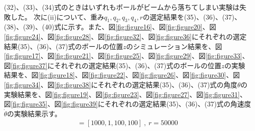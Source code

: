 \documentclass[a4paper,10.5pt]{ltjsarticle}
\begin{document}
(32)、(33)、(34)式のときはいずれもボールがビームから落ちてしまい実験は失敗した。
次に(ii)について、重み$q_1,q_2,q_3,q_4,r$の選定結果を(35)、(36)、(37)、(38)、(39)、(40)式に示す。また、図\ref{fig:figure16}、図\ref{fig:figure20}、図\ref{fig:figure24}、図\ref{fig:figure28}、図\ref{fig:figure32}、図\ref{fig:figure36}にそれぞれの選定結果(35)、(36)、(37)式のボールの位置$z$のシミュレーション結果を、図\ref{fig:figure17}、図\ref{fig:figure21}、図\ref{fig:figure25}、図\ref{fig:figure29}、図\ref{fig:figure33}、図\ref{fig:figure37}にそれぞれの選定結果(35)、(36)、(37)式のボールの位置$z$の実験結果を、図\ref{fig:figure18}、図\ref{fig:figure22}、図\ref{fig:figure26}、図\ref{fig:figure30}、図\ref{fig:figure34}、図\ref{fig:figure38}にそれぞれの選定結果(35)、(36)、(37)式の角度$\theta$の実験結果を、図\ref{fig:figure19}、図\ref{fig:figure23}、図\ref{fig:figure27}、図\ref{fig:figure31}、図\ref{fig:figure35}、図\ref{fig:figure39}にそれぞれの選定結果(35)、(36)、(37)式の角速度$\dot{\theta}$の実験結果示す。
\clearpage
\begin{align}
  [q_1,q_2,q_3,q_4]=[1000,1,100,100]\ ,\ r=50000
\end{align}
\end{document}
